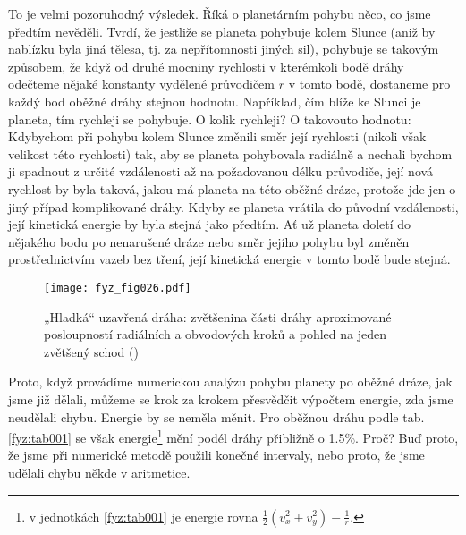     To je velmi pozoruhodný výsledek. Říká o planetárním pohybu něco, co jsme předtím nevěděli. 
    Tvrdí, že jestliže se planeta pohybuje kolem Slunce (aniž by nablízku byla jiná tělesa, tj. za 
    nepřítomnosti jiných sil), pohybuje se takovým způsobem, že když od druhé mocniny rychlosti v 
    kterémkoli bodě dráhy odečteme nějaké konstanty vydělené průvodičem \(r\) v tomto bodě, 
    dostaneme pro každý bod oběžné dráhy stejnou hodnotu. Například, čím blíže ke Slunci je 
    planeta, tím rychleji se pohybuje. O kolik rychleji? O takovouto hodnotu: Kdybychom při pohybu 
    kolem Slunce změnili směr její rychlosti (nikoli však velikost této rychlosti) tak, aby se 
    planeta pohybovala radiálně a nechali bychom ji spadnout z určité vzdálenosti až na požadovanou 
    délku průvodiče, její nová rychlost by byla taková, jakou má planeta na této oběžné dráze, 
    protože jde jen o jiný případ komplikované dráhy. Kdyby se planeta vrátila do původní 
    vzdálenosti, její kinetická energie by byla stejná jako předtím. Ať už planeta doletí do 
    nějakého bodu po nenarušené dráze nebo směr jejího pohybu byl změněn prostřednictvím vazeb bez 
    tření, její kinetická energie v tomto bodě bude stejná.

    \begin{figure}[ht!]  %
      \centering
      \texttt{[image: fyz\_fig026.pdf]}
      \caption{„Hladká“ uzavřená dráha: zvětšenina části dráhy aproximované posloupností radiálních 
      a obvodových kroků a pohled na jeden zvětšený schod (\cite[s.~191]{Feynman01})}
      \label{fyz:fig026}
    \end{figure}
    Proto, když provádíme numerickou analýzu pohybu planety po oběžné dráze, jak jsme již dělali, 
    můžeme se krok za krokem přesvědčit výpočtem energie, zda jsme neudělali chybu. Energie by se 
    neměla měnit. Pro oběžnou dráhu podle tab. \ref{fyz:tab001} se však energie\footnote{v 
    jednotkách \ref{fyz:tab001} je energie rovna \(\frac{1}{2}(v_x^2+v_y^2)-\frac{1}{r}\).} mění 
    podél dráhy přibližně o \num{1.5}\%. Proč? Buď proto, že jsme při numerické metodě použili 
    konečné intervaly, nebo proto, že jsme udělali chybu někde v aritmetice.
    
